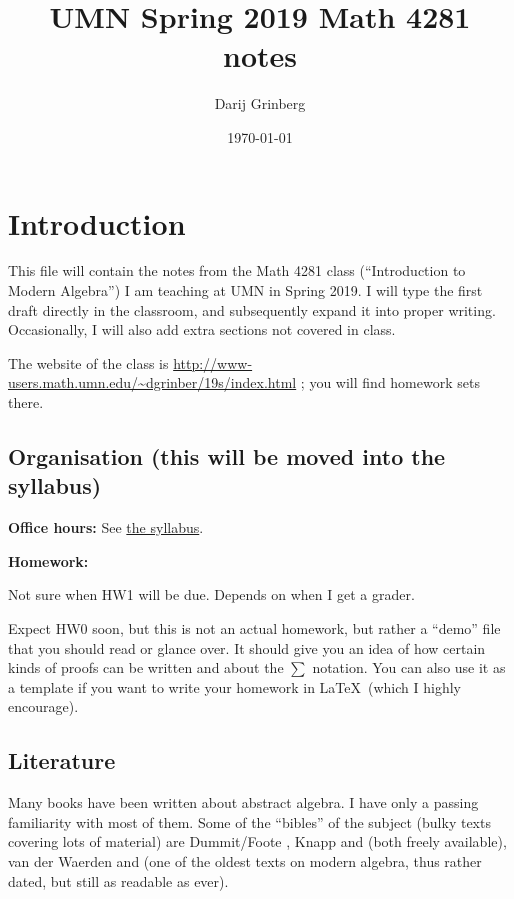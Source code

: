 \documentclass[numbers=enddot,12pt,final,onecolumn,notitlepage]{scrartcl}%
\numberwithin{exer}{section}
\theoremstyle{definition}
\let\sumnonlimits\sum
\renewcommand{\sum}{\sumnonlimits\limits}
\begin{document}
\title{UMN Spring 2019 Math 4281 notes}
\author{Darij Grinberg}
\date{
\today
}
\maketitle
\tableofcontents

\section{Introduction}

This file will contain the notes from the Math 4281 class (``Introduction to
Modern Algebra'') I am teaching at UMN in Spring 2019. I will type the first
draft directly in the classroom, and subsequently expand it into proper
writing. Occasionally, I will also add extra sections not covered in class.

The website of the class is
\url{http://www-users.math.umn.edu/~dgrinber/19s/index.html} ; you will find
homework sets there.

\subsection{Organisation (this will be moved into the syllabus)}

\textbf{Office hours:} See
\href{http://www-users.math.umn.edu/~dgrinber/19s/syll.pdf}{the syllabus}.

\textbf{Homework:}

Not sure when HW1 will be due. Depends on when I get a grader.

Expect HW0 soon, but this is not an actual homework, but rather a ``demo''
file that you should read or glance over. It should give you an idea of how
certain kinds of proofs can be written and about the $\sum$ notation. You can
also use it as a template if you want to write your homework in \LaTeX\ (which
I highly encourage).

\subsection{Literature}

Many books have been written about abstract algebra. I have only a passing
familiarity with most of them. Some of the ``bibles'' of the subject (bulky
texts covering lots of material) are Dummit/Foote \cite{Dummit-Foote}, Knapp
\cite{Knapp1} and \cite{Knapp2} (both freely available), van der Waerden
\cite{Waerden1} and \cite{Waerden2} (one of the oldest texts on modern
algebra, thus rather dated, but still as readable as ever).
\end{document}
